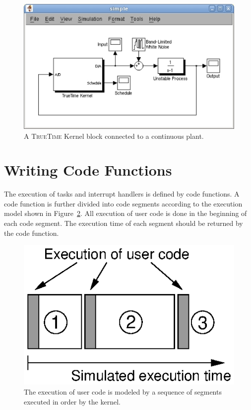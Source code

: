 \documentclass[final,twoside]{rapport}
\begin{document}
\begin{figure}[htbp]
  \begin{center}
    \includegraphics[scale=.5]{simple.eps}
  \end{center}
  \caption{A \textsc{TrueTime} Kernel block connected to a
    continuous plant.}
  \label{fig:ex}
\end{figure}

\section{Writing Code Functions}
The execution of tasks and interrupt handlers is defined by code
functions. A code function is further divided into code segments
according to the execution model shown in Figure~\ref{fig:timeline}.
All execution of user code is done in the beginning of each code
segment. The execution time of each segment should be returned by the
code function.

\begin{figure}[htbp]
  \begin{center}
    \includegraphics[scale=1.05]{timeline.eps}
  \end{center}
  \caption{The execution of user code is modeled by a sequence of
    segments executed in order by the kernel.}
  \label{fig:timeline}
\end{figure}
\end{document}
